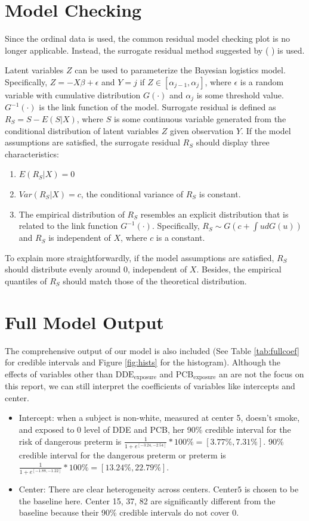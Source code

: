 \documentclass[wcp]{jmlr}%
\begin{document}
\section{Model Checking}
Since the ordinal data is used, the common residual model checking plot is no longer applicable. Instead, the surrogate residual method suggested by (%
) is used. 

Latent variables $Z$ can be used to parameterize the Bayesian logistics model. Specifically, $Z=-X\beta+\epsilon$ and $Y=j$ if $Z\in[\alpha_{j-1},\alpha_{j}]$, where $\epsilon$ is a random variable with cumulative distribution $G(\cdot)$ and $\alpha_{j}$ is some threshold value. $G^{-1}(\cdot)$ is the link function of the model. Surrogate residual is defined as $R_S=S-E(S|X)$, where $S$ is some continuous variable generated from the conditional distribution of latent variables $Z$ given observation $Y$. If the model assumptions are satisfied, the surrogate residual $R_S$ should display three characteristics: 

\begin{enumerate}
	\item $E(R_S|X)=0$
	\item $Var(R_S|X)=c$, the conditional variance of $R_S$ is constant.
	\item The empirical distribution of $R_S$ resembles an explicit distribution that is related to the link function $G^{-1}(\cdot)$. Specifically, $R_S\sim G(c+\int ud G(u))$ and $R_S$ is independent of $X$, where $c$ is a constant.
\end{enumerate}

To explain more straightforwardly, if the model assumptions are satisfied, $R_S$ should distribute evenly around 0, independent of $X$. Besides, the empirical quantiles of $R_S$  should match those of the theoretical distribution.

\section{Full Model Output}
The comprehensive output of our model is also included (See Table \ref{tab:fullcoef} for credible intervals and Figure \ref{fig:hists} for the histogram). Although the effects of variables other than $\text{DDE}_{\text{exposure}}$ and $\text{PCB}_{\text{exposure}}$ an are not the focus on this report, we can still interpret the coefficients of variables like intercepts and center. 
\begin{itemize}
	\item Intercept: when a subject is non-white, measured at center 5, doesn't smoke, and exposed to 0 level of DDE and PCB, her 90\% credible interval for the risk of dangerous preterm is $\frac{1}{1+e^{[-3.24, -2.54]}}*100\%=[3.77\%, 7.31\%]$.  90\% credible interval for the dangerous preterm or preterm is $\frac{1}{1+e^{[-1.88, -1.22]}}*100\%=[13.24\%, 22.79\%]$.
	
	\item Center: There are clear heterogeneity across centers. Center$5$ is chosen to be the baseline here. Center 15, 37, 82 are significantly different from the baseline because their 90\% credible intervals do not cover 0.
\end{itemize}
\end{document}
